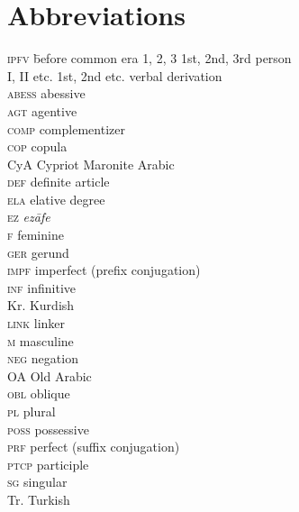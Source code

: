 \documentclass[output=paper]{langsci/langscibook}
\begin{document}
\section*{Abbreviations}
\begin{multicols}{2}
\begin{tabbing}
\textsc{ipfv} \hspace{1.5em} \= before common era\kill
\textsc{1, 2, 3} \> 1st, 2nd, 3rd person \\
I, II etc. \> 1st, 2nd etc. verbal derivation \\
\textsc{abess} \> abessive \\
\textsc{agt} \> agentive \\
\textsc{comp} \> complementizer \\
\textsc{cop} \> copula \\
CyA \> Cypriot Maronite Arabic \\
\textsc{def} \> definite article \\
\textsc{ela} \> elative degree \\
\textsc{ez} \> \textit{ezāfe} \\
\textsc{f} \> feminine \\
\textsc{ger} \> gerund \\
\textsc{impf} \> imperfect (prefix conjugation) \\
\textsc{inf} \> infinitive \\
Kr. \> Kurdish \\
\textsc{link} \> linker \\
\textsc{m} \> masculine \\
\textsc{neg} \> negation  \\
OA \> Old Arabic \\
\textsc{obl} \> oblique \\
\textsc{pl} \> plural \\
\textsc{poss} \> possessive  \\
\textsc{prf} \> perfect (suffix conjugation) \\
\textsc{ptcp} \> participle \\
\textsc{sg} \> singular \\
Tr. \> Turkish
\end{tabbing}
\end{multicols}

{\sloppy\printbibliography[heading=subbibliography,notkeyword=this]}
\end{document}
